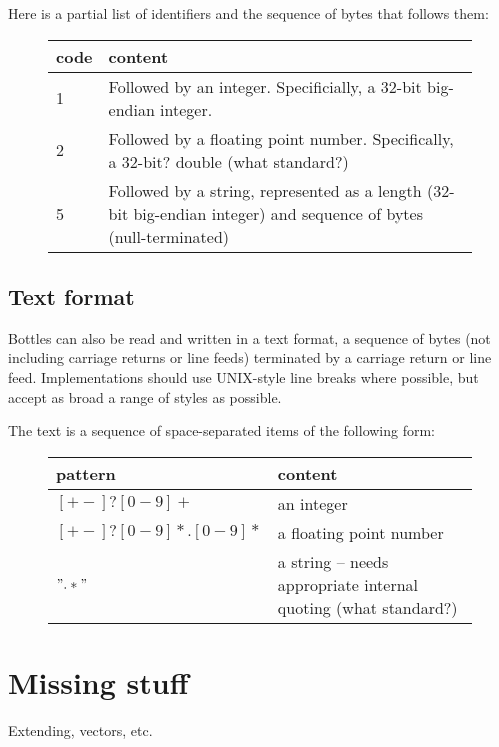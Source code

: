 \noindent
Here is a partial list of identifiers and the sequence of bytes
that follows them:

\begin{figure}[h]
\begin{tabular}{|l|p{5in}|}
\hline
{\bf code} & {\bf content} \\ \hline\hline
1 & Followed by an integer.  Specificially, a 32-bit big-endian integer. \\
2 & Followed by a floating point number.  Specifically, a 32-bit? double (what standard?) \\
5 & Followed by a string, represented as a length (32-bit big-endian integer) and
    sequence of bytes (null-terminated) \\
\hline
\end{tabular}
\end{figure}


\subsection{Text format}

Bottles can also be read and written in a text format, a sequence of
bytes (not including carriage returns or line feeds) terminated by a
carriage return or line feed.  Implementations should use UNIX-style
line breaks where possible, but accept as broad a range of styles as
possible.

The text is a sequence of space-separated items of the following form:

\begin{figure}[h]
\begin{tabular}{|l|p{5in}|}
\hline
{\bf pattern} & {\bf content} \\ \hline\hline
$[+-]?[0-9]+$ & an integer \\
$[+-]?[0-9]*.[0-9]*$ & a floating point number \\
$".*"$ & a string -- needs appropriate internal quoting (what standard?) \\
\hline
\end{tabular}
\end{figure}


\section{Missing stuff}

Extending, vectors, etc.

